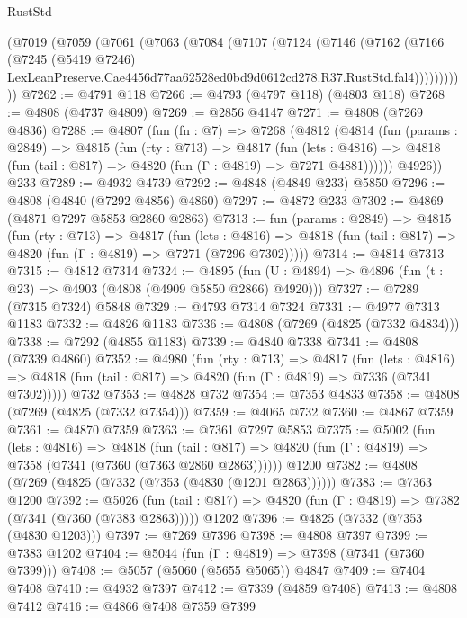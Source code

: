 \begin{lexlean}{RustStd}
\begin{coremodule}
    (@7019
      (@7059
        (@7061
          (@7063
            (@7084
              (@7107
                (@7124
                  (@7146
                    (@7162
                      (@7166
                        (@7245
                          (@5419 @7246)
                          LexLeanPreserve.Cae4456d77aa62528ed0bd9d0612cd278.R37.RustStd.fal4)))))))))))
@7262 := @4791 @118
@7266 := @4793 (@4797 @118) (@4803 @118)
@7268 := @4808 (@4737 @4809)
@7269 := @2856 @4147
@7271 := @4808 (@7269 @4836)
@7288 := @4807
    (fun (fn : @7) =>
    @7268
      (@4812
        (@4814
          (fun (params : @2849) =>
          @4815
            (fun (rty : @713) =>
            @4817
              (fun (lets : @4816) =>
              @4818 (fun (tail : @817) => @4820 (fun (Γ : @4819) => @7271 @4881))))))
        @4926))
    @233
@7289 := @4932 @4739
@7292 := @4848 (@4849 @233) @5850
@7296 := @4808 (@4840 (@7292 @4856) @4860)
@7297 := @4872 @233
@7302 := @4869 (@4871 @7297 @5853 @2860 @2863)
@7313 := fun (params : @2849) =>
  @4815
    (fun (rty : @713) =>
    @4817
      (fun (lets : @4816) =>
      @4818 (fun (tail : @817) => @4820 (fun (Γ : @4819) => @7271 (@7296 @7302)))))
@7314 := @4814 @7313
@7315 := @4812 @7314
@7324 := @4895 (fun (U : @4894) => @4896 (fun (t : @23) => @4903 (@4808 (@4909 @5850 @2866) @4920)))
@7327 := @7289 (@7315 @7324) @5848
@7329 := @4793 @7314 @7324
@7331 := @4977 @7313 @1183
@7332 := @4826 @1183
@7336 := @4808 (@7269 (@4825 (@7332 @4834)))
@7338 := @7292 (@4855 @1183)
@7339 := @4840 @7338
@7341 := @4808 (@7339 @4860)
@7352 := @4980
    (fun (rty : @713) =>
    @4817
      (fun (lets : @4816) =>
      @4818 (fun (tail : @817) => @4820 (fun (Γ : @4819) => @7336 (@7341 @7302)))))
    @732
@7353 := @4828 @732
@7354 := @7353 @4833
@7358 := @4808 (@7269 (@4825 (@7332 @7354)))
@7359 := @4065 @732
@7360 := @4867 @7359
@7361 := @4870 @7359
@7363 := @7361 @7297 @5853
@7375 := @5002
    (fun (lets : @4816) =>
    @4818
      (fun (tail : @817) => @4820 (fun (Γ : @4819) => @7358 (@7341 (@7360 (@7363 @2860 @2863))))))
    @1200
@7382 := @4808 (@7269 (@4825 (@7332 (@7353 (@4830 (@1201 @2863))))))
@7383 := @7363 @1200
@7392 := @5026
    (fun (tail : @817) => @4820 (fun (Γ : @4819) => @7382 (@7341 (@7360 (@7383 @2863)))))
    @1202
@7396 := @4825 (@7332 (@7353 (@4830 @1203)))
@7397 := @7269 @7396
@7398 := @4808 @7397
@7399 := @7383 @1202
@7404 := @5044 (fun (Γ : @4819) => @7398 (@7341 (@7360 @7399)))
@7408 := @5057 (@5060 (@5655 @5065)) @4847
@7409 := @7404 @7408
@7410 := @4932 @7397
@7412 := @7339 (@4859 @7408)
@7413 := @4808 @7412
@7416 := @4866 @7408 @7359 @7399

\end{coremodule}
\end{lexlean}
